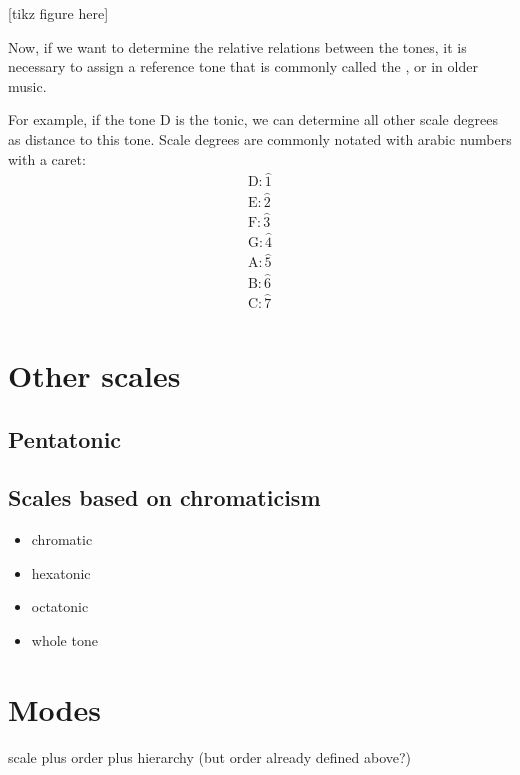 \documentclass[letterpaper,10pt,english]{sphinxmanual}
\begin{document}
{[}tikz figure here{]}

Now, if we want to determine the relative relations between the tones,
it is necessary to assign a reference tone that is commonly called the ,
or  in older music.

For example, if the tone D is the tonic, we can determine all other scale degrees
as distance to this tone. Scale degrees are commonly notated with arabic numbers with a caret:
\begin{equation*}
\begin{split}\text{D}: \hat{1}\\
\text{E}: \hat{2}\\
\text{F}: \hat{3}\\
\text{G}: \hat{4}\\
\text{A}: \hat{5}\\
\text{B}: \hat{6}\\
\text{C}: \hat{7}\\\end{split}
\end{equation*}

\section{Other scales}
\label{\detokenize{3_fundamentals2:other-scales}}

\subsection{Pentatonic}
\label{\detokenize{3_fundamentals2:pentatonic}}

\subsection{Scales based on chromaticism}
\label{\detokenize{3_fundamentals2:scales-based-on-chromaticism}}\begin{itemize}
\item {} 
chromatic

\item {} 
hexatonic

\item {} 
octatonic

\item {} 
whole tone

\end{itemize}


\section{Modes}
\label{\detokenize{3_fundamentals2:modes}}
scale plus order plus hierarchy (but order already defined above?)
\end{document}
